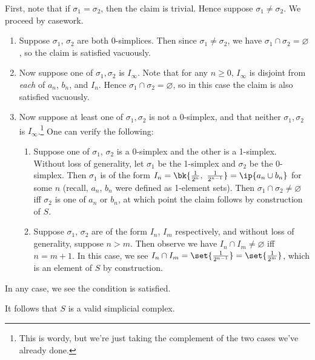 \begin{sproof}[Sketch]
\begin{leftbar}
\begin{enumerate}
        First, note that if $\sigma_1 = \sigma_2$, then the claim is
        trivial. Hence suppose $\sigma_1 \neq \sigma_2$. We proceed by
        casework.
        \begin{enumerate}[label=\arabic*)]
          \item Suppose $\sigma_1$, $\sigma_2$ are both 0-simplices.
            Then since $\sigma_1 \neq \sigma_2$, we have $\sigma_1
            \cap \sigma_2 = \varnothing$, so the claim is satisfied
            vacuously.
          \item Now suppose one of $\sigma_1, \sigma_2$ is $I_\infty$.
            Note that for any $n \geq 0$, $I_\infty$ is disjoint from
            \emph{each} of $a_n$, $b_n$, and $I_n$. Hence $\sigma_1 \cap
            \sigma_2 = \varnothing$, so in this case the claim is also
            satisfied vacuously.
          \item Now suppose at least one of $\sigma_1, \sigma_2$ is not
            a 0-simplex, and that neither $\sigma_1, \sigma_2$ is
            $I_\infty$.\footnote{This is wordy, but we're just taking
            the complement of the two cases we've already done.} One can
            verify the following:
            \begin{enumerate}[label=\roman*)]
              \item Suppose one of $\sigma_1$, $\sigma_2$ is a 0-simplex
                and the other is a 1-simplex. Without loss of
                generality, let $\sigma_1$ be the 1-simplex and
                $\sigma_2$ be the 0-simplex. Then $\sigma_1$ is of the
                form $I_n = \bk{\frac{1}{2^n},\ \frac{1}{2^{n-1}}} =
                \ip{a_n \cup b_n}$ for some $n$ (recall, $a_n$, $b_n$
                were defined as 1-element sets). Then $\sigma_1 \cap
                \sigma_2 \neq\varnothing$ iff $\sigma_2$ is one of
                $a_n$ or $b_n$, at which point the claim follows by
                construction of $S$.
              \item Suppose $\sigma_1$, $\sigma_2$ are of the form $I_n$,
                $I_m$ respectively, and without loss of generality,
                suppose $n > m$. Then observe we have $I_n \cap I_m
                \neq \varnothing$ iff $n = m+1$. In this case, we see
                $I_n \cap I_m = \set{\frac{1}{2^{n-1}}} =
                \set{\frac{1}{2^m}}$, which is an element of $S$ by
                construction.
            \end{enumerate}
        \end{enumerate}
        In any case, we see the condition is satisfied.
    \end{enumerate}
    It follows that $S$ is a valid simplicial complex.
  \end{leftbar}


\end{sproof}
